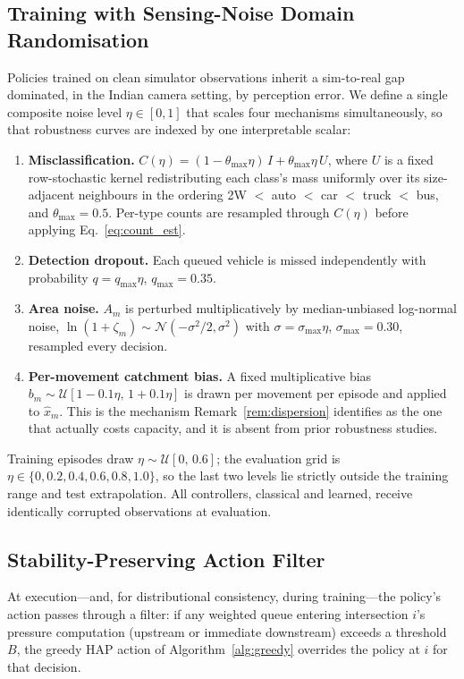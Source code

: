 \documentclass[journal]{IEEEtran}
\begin{document}
\subsection{Training with Sensing-Noise Domain Randomisation}
\label{subsec:noise}
Policies trained on clean simulator observations inherit a sim-to-real
gap dominated, in the Indian camera setting, by perception error. We
define a single composite noise level $\eta \in [0,1]$ that scales four
mechanisms simultaneously, so that robustness curves are indexed by one
interpretable scalar:

\begin{enumerate}
\item \textbf{Misclassification.} $C(\eta) = (1-\theta_{\max}\eta)\,I
      + \theta_{\max}\eta\,U$, where $U$ is a fixed row-stochastic kernel
      redistributing each class's mass uniformly over its size-adjacent
      neighbours in the ordering
      2W $<$ auto $<$ car $<$ truck $<$ bus, and
      $\theta_{\max}=0.5$. Per-type counts are resampled through
      $C(\eta)$ before applying Eq.~\eqref{eq:count_est}.
\item \textbf{Detection dropout.} Each queued vehicle is missed
      independently with probability $q = q_{\max}\eta$,
      $q_{\max}=0.35$.
\item \textbf{Area noise.} $A_m$ is perturbed multiplicatively by
      median-unbiased log-normal noise,
      $\ln(1{+}\zeta_m)\sim\mathcal{N}(-\sigma^2/2,\sigma^2)$ with
      $\sigma=\sigma_{\max}\eta$, $\sigma_{\max}=0.30$, resampled every
      decision.
\item \textbf{Per-movement catchment bias.} A fixed multiplicative bias
      $b_m\sim\mathcal{U}[1-0.1\eta,\,1+0.1\eta]$ is drawn per movement
      per episode and applied to $\hat{x}_m$. This is the mechanism
      Remark~\ref{rem:dispersion} identifies as the one that actually
      costs capacity, and it is absent from prior robustness studies.
\end{enumerate}

Training episodes draw $\eta\sim\mathcal{U}[0,\,0.6]$; the evaluation
grid is $\eta \in \{0,0.2,0.4,0.6,0.8,1.0\}$, so the last two levels lie
strictly outside the training range and test extrapolation. All
controllers, classical and learned, receive identically corrupted
observations at evaluation.

\subsection{Stability-Preserving Action Filter}
\label{subsec:filter}
At execution---and, for distributional consistency, during
training---the policy's action passes through a filter: if any weighted
queue entering intersection $i$'s pressure computation (upstream or
immediate downstream) exceeds a threshold $B$, the greedy HAP action of
Algorithm~\ref{alg:greedy} overrides the policy at $i$ for that decision.
\end{document}
